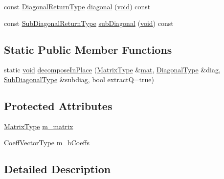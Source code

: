 \begin{DoxyCompactItemize}
\item 
const \hyperlink{class_tridiagonalization_a4641fd1d32be493cb55fe788e331c9c6}{Diagonal\-Return\-Type} \hyperlink{class_tridiagonalization_aa23d77ff7f208e370b9a65cea783e7ad}{diagonal} (\hyperlink{group___u_a_v_objects_plugin_ga444cf2ff3f0ecbe028adce838d373f5c}{void}) const 
\item 
const \hyperlink{class_tridiagonalization_a33e6be2d3c2de1a7cebc05f5b90dc50a}{Sub\-Diagonal\-Return\-Type} \hyperlink{class_tridiagonalization_ab3b2263fb133bbfa58edde6ebd3ba92a}{sub\-Diagonal} (\hyperlink{group___u_a_v_objects_plugin_ga444cf2ff3f0ecbe028adce838d373f5c}{void}) const 
\end{DoxyCompactItemize}
\subsection*{Static Public Member Functions}
\begin{DoxyCompactItemize}
\item 
static \hyperlink{group___u_a_v_objects_plugin_ga444cf2ff3f0ecbe028adce838d373f5c}{void} \hyperlink{class_tridiagonalization_a5a85ea619add22c090f8625b2fdda4cf}{decompose\-In\-Place} (\hyperlink{class_tridiagonalization_a527ab9a2b51075a625d5a7f1ef44b3c6}{Matrix\-Type} \&\hyperlink{uavobjecttemplate_8m_a16a51e808b16c46bbfd36da2e37cd123}{mat}, \hyperlink{class_tridiagonalization_a5ea34cf11c675c0a45c309aa7cb662b0}{Diagonal\-Type} \&diag, \hyperlink{class_tridiagonalization_aa2c70f74fdd0ebda80b4dec2248f3732}{Sub\-Diagonal\-Type} \&subdiag, bool extract\-Q=true)
\end{DoxyCompactItemize}
\subsection*{Protected Attributes}
\begin{DoxyCompactItemize}
\item 
\hyperlink{class_tridiagonalization_a527ab9a2b51075a625d5a7f1ef44b3c6}{Matrix\-Type} \hyperlink{class_tridiagonalization_a168483e5aed1af322c527c5f8627b4f8}{m\-\_\-matrix}
\item 
\hyperlink{class_tridiagonalization_aae368c68d55fd86aa74b45fe1124864d}{Coeff\-Vector\-Type} \hyperlink{class_tridiagonalization_a905f25c9997f645433bd34cc91f91344}{m\-\_\-h\-Coeffs}
\end{DoxyCompactItemize}


\subsection{Detailed Description}
